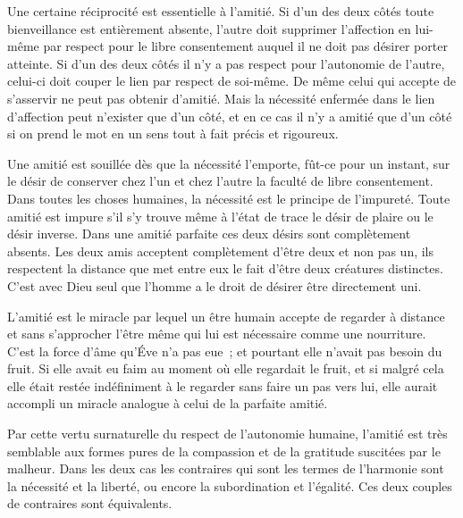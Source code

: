 \documentclass[french,twoside]{book} %
\begin{document}
Une certaine réciprocité est essentielle à l'amitié. Si d'un des deux côtés toute bienveillance est entièrement absente, l'autre doit supprimer l'affection en lui-même par respect pour le libre consentement auquel il ne doit pas désirer porter atteinte. Si d'un des deux côtés il n'y a pas respect pour l'autonomie de l'autre, celui-ci doit couper le lien par respect de soi-même. De même celui qui accepte de s'asservir ne peut pas obtenir d'amitié. Mais la nécessité enfermée dans le lien d'affection peut n'exister que d'un côté, et en ce cas il n'y a amitié que d'un côté si on prend le mot en un sens tout à fait précis et rigoureux.\par
Une amitié est souillée dès que la nécessité l'emporte, fût-ce pour un instant, sur le désir de conserver chez l'un et chez l'autre la faculté de libre consentement. Dans toutes les choses humaines, la nécessité est le principe de l'impureté. Toute amitié est impure s'il s'y trouve même à l'état de trace le désir de plaire ou le désir inverse. Dans une amitié parfaite ces deux désirs sont complètement absents. Les deux amis acceptent complètement d'être deux et non pas un, ils respectent la distance que met entre eux le fait d'être deux créatures distinctes. C'est avec Dieu seul que l'homme a le droit de désirer être directement uni.\par
L'amitié est le miracle par lequel un être humain accepte de regarder à distance et sans s'approcher l'être même qui lui est nécessaire comme une nourriture. C'est la force d'âme qu'Éve n'a pas eue ; et pourtant elle n'avait pas besoin du fruit. Si elle avait eu faim au moment où elle regardait le fruit, et si malgré cela elle était restée indéfiniment à le regarder sans faire un pas vers lui, elle aurait accompli un miracle analogue à celui de la parfaite amitié.\par
Par cette vertu surnaturelle du respect de l'autonomie humaine, l'amitié est très semblable aux formes pures de la compassion et de la gratitude suscitées par le malheur. Dans les deux cas les contraires qui sont les termes de l'harmonie sont la nécessité et la liberté, ou encore la subordination et l'égalité. Ces deux couples de contraires sont équivalents.\par
\end{document}
